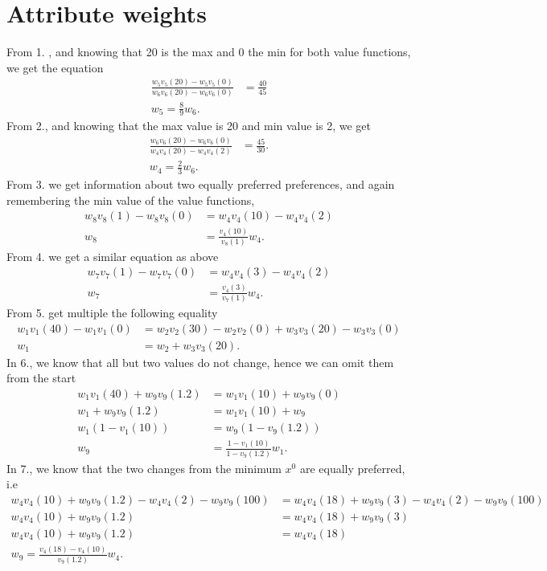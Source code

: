 \documentclass{article}
\begin{document}
\section{Attribute weights}
	From 1. , and knowing that 20 is the max and 0 the min for both value functions, we get the equation
	\begin{align}
		\frac{w_5 v_5(20)-w_5 v_5(0)}{w_6v_6(20)-w_6v_6(0)} &= \frac{40}{45}\\
		w_5 = \frac{8}{9}w_6.
	\end{align}
	From 2., and knowing that the max value is 20 and min value is 2, we get
	\begin{align}
		\frac{w_6 v_6(20)-w_6 v_6(0)}{w_4v_4(20)-w_4v_4(2)} &= \frac{45}{30}.\\
		w_4 = \frac{2}{3}w_6.
	\end{align}
	From 3. we get information about two equally preferred preferences, and again remembering the min value of the value functions,
	\begin{align}
		w_8v_8(1) - w_8v_8(0) &= w_4v_4(10) - w_4v_4(2)\\
		w_8 &=  \frac{v_4(10)}{v_8(1)}w_4.
	\end{align}
	From 4. we get a similar equation as above
	\begin{align}
		w_7v_7(1) - w_7v_7(0) &= w_4v_4(3) - w_4v_4(2)\\
		w_7 &=  \frac{v_4(3)}{v_7(1)}w_4.
	\end{align}
	From 5.	get multiple the following equality
	\begin{align}
		w_1v_1(40) - w_1v_1(0) &= w_2v_2(30) - w_2v_2(0) + w_3v_3(20) - w_3v_3(0)\\
		w_1 &= w_2 + w_3v_3(20).
	\end{align}
	In 6., we know that all but two values do not change, hence we can omit them from the start
	\begin{align}
		w_1v_1(40) + w_9v_9(1.2) &= w_1v_1(10) + w_9v_9(0)\\
		w_1 + w_9v_9(1.2) &= w_1v_1(10) + w_9\\
		w_1(1-v_1(10))&=w_9(1-v_9(1.2))\\
		w_9&=\frac{1-v_1(10)}{1-v_9(1.2)}w_1.
	\end{align}
	In 7., we know that the two changes from the minimum $x^0$ are equally preferred, i.e
	\begin{align}
		w_4v_4(10) + w_9v_9(1.2) - w_4v_4(2) - w_9v_9(100) &= w_4v_4(18) + w_9v_9(3) - w_4v_4(2) - w_9v_9(100)\\
		w_4v_4(10) + w_9v_9(1.2) &= w_4v_4(18) + w_9v_9(3)\\
		w_4v_4(10) + w_9v_9(1.2) &= w_4v_4(18)\\
		w_9 = \frac{v_4(18)-v_4(10)}{v_9(1.2)}w_4.
	\end{align}
\end{document}
